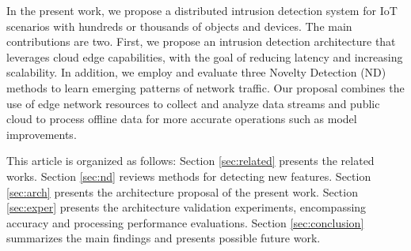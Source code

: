 In the present work, we propose a distributed intrusion detection system for IoT
scenarios with hundreds or thousands of objects and devices. The main
contributions are two. First, we propose an intrusion detection architecture
that leverages cloud edge capabilities, with the goal of reducing latency and
increasing scalability. In addition, we employ and evaluate three Novelty
Detection (ND) methods to learn emerging patterns of network traffic. Our
proposal combines the use of edge network resources to collect and analyze data
streams and public cloud to process offline data for more accurate operations
such as model improvements.


This article is organized as follows: Section \ref{sec:related} presents the
related works. Section \ref{sec:nd} reviews methods for detecting new features.
Section \ref{sec:arch} presents the architecture proposal of the present work.
Section \ref{sec:exper} presents the architecture validation experiments,
encompassing accuracy and processing performance evaluations. Section
\ref{sec:conclusion} summarizes the main findings and presents possible future
work.







